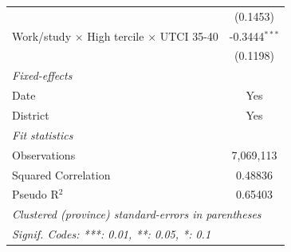 \begin{table}[htbp]
\begin{tabular}{lc}
                                                                        & (0.1453)\\   
      Work/study $\times$ High tercile $\times$ UTCI 35-40              & -0.3444$^{***}$\\   
                                                                        & (0.1198)\\   
      \midrule
      \emph{Fixed-effects}\\
      Date                                                              & Yes\\  
      District                                                          & Yes\\  
      \midrule
      \emph{Fit statistics}\\
      Observations                                                      & 7,069,113\\  
      Squared Correlation                                               & 0.48836\\  
      Pseudo R$^2$                                                      & 0.65403\\  
      \midrule \midrule
      \multicolumn{2}{l}{\emph{Clustered (province) standard-errors in parentheses}}\\
      \multicolumn{2}{l}{\emph{Signif. Codes: ***: 0.01, **: 0.05, *: 0.1}}\\
   \end{tabular}
\end{table}


